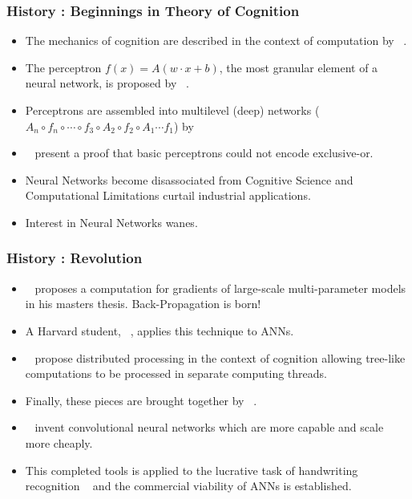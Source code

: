 \begin{frame}
  \frametitle{History : Beginnings in Theory of Cognition}
  \begin{itemize}
     \item<1->  The mechanics of cognition are described in the context of
      computation by ~\citet{mcculloch1943logical}. 
      \item<2-> The perceptron $f(x) = A(w \cdot x + b)$, the
        most granular element of a neural network, is proposed by
        ~\citet{rosenblatt1958perceptron}. 
      \item<3->  Perceptrons are assembled into multilevel (deep)
        networks ($A_n \circ f_n \circ
        \cdots \circ f_3 \circ A_2 \circ f_2 \circ
        A_1 \cdots f_1$) by ~\citet{ivakhnenko1965cybernetic}
      \item<5->  ~\citet{minsky1969perceptrons} present a proof that
        basic perceptrons could not encode exclusive-or. 
      \item<6->  Neural Networks become disassociated from Cognitive
        Science and Computational Limitations curtail industrial
        applications. 
      \item<7-> Interest in Neural Networks wanes. 
  \end{itemize}
\end{frame}

\begin{frame}
  \frametitle{History : Revolution}
  \begin{itemize}
      \item<1-> ~\citet{linnainmaa1970representation} proposes
        a computation for gradients of large-scale multi-parameter
 models in his masters thesis. Back-Propagation is born!
      \item<2->  A Harvard student,  ~\citep{werbos1974beyond},
        applies this technique to ANNs. 
      \item<3->  ~\citet{mcclelland1986parallel} propose distributed
        processing in the context of cognition allowing tree-like
        computations to be processed in separate computing threads. 
      \item<4-> Finally, these pieces are brought together by
        ~\citet{lecun1989backpropagation}. 
      \item<5->  ~\citep{lecun1995convolutional} invent convolutional
        neural networks which are more capable and scale more
        cheaply.
        \item <6-> This completed tools is applied to the
        lucrative task of handwriting recognition
        ~\citep{lecun1998gradient} and the commercial viability of
        ANNs is established. 

  \end{itemize}
\end{frame}

